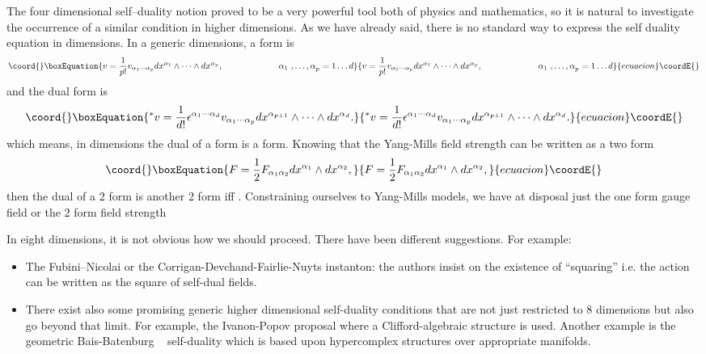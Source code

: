 \documentclass[a4paper,12pt]{book}
\begin{document}
The four dimensional self--duality notion proved to be a very powerful tool
both of physics and mathematics, so it is natural to investigate the
occurrence of a similar condition in higher dimensions. As we have already
said, there is no standard way to express the self duality equation in \coordHE{}
dimensions. In a generic \coordHE{} dimensions, a \coordHE{} form \coordHE{} is 
\begin{equation}\coord{}\boxEquation{
v=\frac{1}{p!}v_{\alpha _{1}\cdots \alpha _{p}}dx^{\alpha _{1}}\wedge \cdots
\wedge dx^{\alpha _{p}},\;\;\;\;\;\;\;\;\;\;\;\;\;\;\;\;\;\;\;\;\;\;{\
\alpha }_{1}{\ ,\ldots ,\alpha }_{p}{\ =1\ldots d}
}{
v=\frac{1}{p!}v_{\alpha _{1}\cdots \alpha _{p}}dx^{\alpha _{1}}\wedge \cdots
\wedge dx^{\alpha _{p}},\;\;\;\;\;\;\;\;\;\;\;\;\;\;\;\;\;\;\;\;\;\;{\
\alpha }_{1}{\ ,\ldots ,\alpha }_{p}{\ =1\ldots d}
}{ecuacion}\coordE{}\end{equation}
and the dual form is 
\begin{equation}\coord{}\boxEquation{
^{\ast }v=\frac{1}{d!}\epsilon ^{\alpha _{1}\cdots \alpha _{d}}v_{\alpha
_{1}\cdots \alpha _{p}}dx^{\alpha _{p+1}}\wedge \cdots \wedge dx^{\alpha
_{d}}.
}{
^{\ast }v=\frac{1}{d!}\epsilon ^{\alpha _{1}\cdots \alpha _{d}}v_{\alpha
_{1}\cdots \alpha _{p}}dx^{\alpha _{p+1}}\wedge \cdots \wedge dx^{\alpha
_{d}}.
}{ecuacion}\coordE{}\end{equation}
which means, in \coordHE{} dimensions the dual of a \coordHE{} form is a \coordHE{} form.
Knowing that the Yang-Mills field strength can be written as a two form 
\begin{equation}\coord{}\boxEquation{
F=\frac{1}{2}F_{\alpha _{1}\alpha _{2}}dx^{\alpha _{1}}\wedge dx^{\alpha
_{2}},
}{
F=\frac{1}{2}F_{\alpha _{1}\alpha _{2}}dx^{\alpha _{1}}\wedge dx^{\alpha
_{2}},
}{ecuacion}\coordE{}\end{equation}
then the dual of a 2 form is another 2 form iff \coordHE{}. Constraining
ourselves to Yang-Mills models, we have at disposal just the one form gauge
field \myHighlight{$A=A_{i}dx^{i}$}\coordHE{} or the 2 form field strength \coordHE{}

In eight dimensions, it is not obvious how we should proceed. There have
been different suggestions. For example:

\begin{itemize}
\item  The Fubini--Nicolai \cite{fub} or the Corrigan-Devchand-Fairlie-Nuyts 
\cite{cdfn} instanton: the authors insist on the existence of ``squaring''
i.e. the action can be written as the square of self-dual fields.

\item  There exist also some promising generic higher dimensional
self-duality conditions that are not just restricted to 8 dimensions but
also go beyond that limit. For example, the Ivanon-Popov \cite{IP} proposal
where a Clifford-algebraic structure is used. Another example is the
geometric Bais-Batenburg \ \cite{bb} self-duality which is based upon
hypercomplex structures over appropriate manifolds.
\end{itemize}
\end{document}
